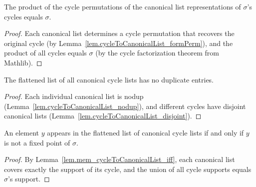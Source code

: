 \begin{lemma}
\label{lem.dcdListToPerm_cyclesList_eq}
\leanhelper
\leanok
The product of the cycle permutations of the canonical list representations of
$\sigma$'s cycles equals $\sigma$.
\end{lemma}

\begin{proof}
\leanok
Each canonical list determines a cycle permutation that recovers the original cycle (by
Lemma~\ref{lem.cycleToCanonicalList_formPerm}), and the product of all cycles
equals $\sigma$ (by the cycle factorization theorem from Mathlib).
\end{proof}

\begin{lemma}
\label{lem.cyclesList_flatten_nodup}
\leanhelper
\leanok
The flattened list of all canonical cycle lists has no duplicate entries.
\end{lemma}

\begin{proof}
\leanok
Each individual canonical list is nodup (Lemma~\ref{lem.cycleToCanonicalList_nodup}),
and different cycles have disjoint canonical lists
(Lemma~\ref{lem.cycleToCanonicalList_disjoint}).
\end{proof}

\begin{lemma}
\label{lem.cyclesList_flatten_eq_support}
\leanhelper
\leanok
An element $y$ appears in the flattened list of canonical cycle lists if and only if
$y$ is not a fixed point of $\sigma$.
\end{lemma}

\begin{proof}
\leanok
By Lemma~\ref{lem.mem_cycleToCanonicalList_iff}, each canonical list covers
exactly the support of its cycle, and the union of all cycle supports equals
$\sigma$'s support.
\end{proof}
